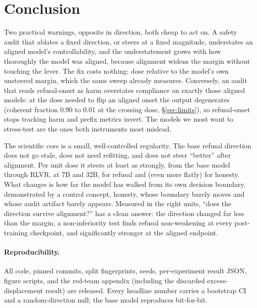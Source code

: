 \documentclass[11pt]{article}
\begin{document}
\section{Conclusion}\label{sec:conclusion}
Two practical warnings, opposite in direction, both cheap to act on. A safety audit that ablates a
fixed direction, or steers at a fixed magnitude, understates an aligned model's controllability, and
the understatement grows with how thoroughly the model was aligned, because alignment widens the
margin without touching the lever. The fix costs nothing: dose relative to the model's own unsteered
margin, which the same sweep already measures. Conversely, an audit that reads refusal-onset as harm
overstates compliance on exactly those aligned models: at the dose needed to flip an aligned onset
the output degenerates (coherent fraction \num{0.90} to \num{0.01} at the crossing dose,
\S\ref{sec:limits}), so refusal-onset stops tracking harm and prefix metrics invert. The models we most want to stress-test are the ones both instruments most
mislead.

The scientific core is a small, well-controlled regularity. The base refusal direction does not go
stale, does not need refitting, and does not steer ``better'' after alignment. Per unit dose it
steers at least as strongly, from the base model through RLVR, at 7B and 32B, for refusal and (even
more flatly) for honesty. What changes is how far the model has walked from its own decision
boundary, demonstrated by a control concept, honesty, whose boundary barely moves and whose audit
artifact barely appears. Measured in the right units, ``does the direction survive alignment?'' has
a clean answer: the direction changed far less than the margin; a non-inferiority test finds refusal non-weakening at every post-training checkpoint, and significantly stronger at the aligned endpoint.

\paragraph{Reproducibility.} All code, pinned commits, split fingerprints, seeds, per-experiment
result JSON, figure scripts, and the red-team appendix (including the discarded excess-displacement
result) are released. Every headline number carries a bootstrap CI and a random-direction null; the
base model reproduces bit-for-bit.




\appendix


\end{document}
